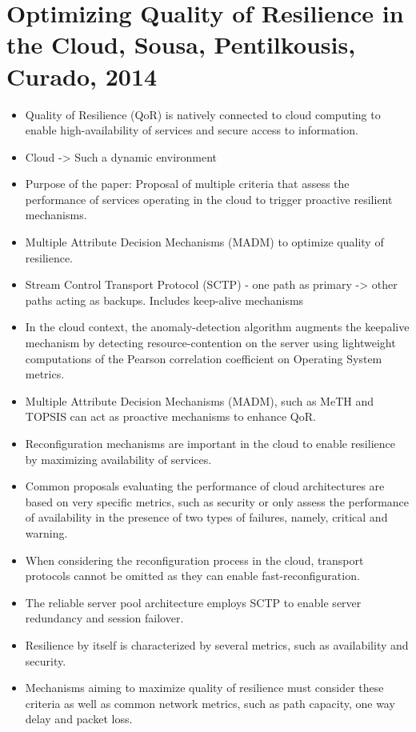 \section{Optimizing Quality of Resilience in the Cloud, Sousa, Pentilkousis, Curado, 2014}

\begin{itemize}
	\item Quality of Resilience (QoR) is natively connected to cloud computing to enable high-availability of services and secure access to information.
	\item Cloud -> Such a dynamic environment
	\item Purpose of the paper: Proposal of multiple criteria that assess the performance of services operating in the cloud to trigger proactive resilient mechanisms.
	\item Multiple Attribute Decision Mechanisms (MADM) to optimize quality of resilience.
	\item Stream Control Transport Protocol (SCTP) - one path as primary -> other paths acting as backups. Includes keep-alive mechanisms
	\item In the cloud context, the anomaly-detection algorithm augments the keepalive mechanism by detecting resource-contention on the server using lightweight computations of the Pearson correlation coefficient on Operating System metrics.
	\item Multiple Attribute Decision Mechanisms (MADM), such as MeTH and TOPSIS can act as proactive mechanisms to enhance QoR.
	\item Reconfiguration mechanisms are important in the cloud to enable resilience by maximizing availability of services.
	\item Common proposals evaluating the performance of cloud architectures are based on very specific metrics, such as security or only assess the performance of availability in the presence of two types of failures, namely, critical and warning.
	\item When considering the reconfiguration process in the cloud, transport protocols cannot be omitted as they can enable fast-reconfiguration.
	\item The reliable server pool architecture employs SCTP to enable server redundancy and session failover.
	\item Resilience by itself is characterized by several metrics, such as availability and security. 
	\item Mechanisms aiming to maximize quality of resilience must consider these criteria as well as common network metrics, such as path capacity, one way delay and packet loss.

\end{itemize}
